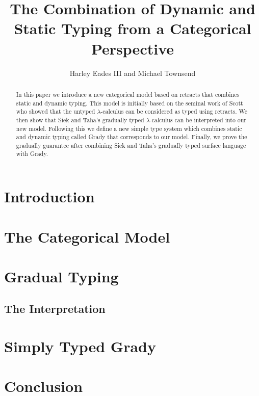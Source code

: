\documentclass{article}
\title{The Combination of Dynamic and Static Typing from a Categorical Perspective}
\author{Harley Eades III and Michael Townsend}
\begin{document}
\maketitle

\begin{abstract} 
  In this paper we introduce a new categorical model based on retracts
  that combines static and dynamic typing.  This model is initially
  based on the seminal work of Scott who showed that the untyped
  $\lambda$-calculus can be considered as typed using retracts.  We
  then show that Siek and Taha's gradually typed $\lambda$-calculus
  can be interpreted into our new model.  Following this we define a
  new simple type system which combines static and dynamic typing
  called Grady that corresponds to our model.  Finally, we prove the
  gradually guarantee after combining Siek and Taha's gradually typed
  surface language with Grady.
\end{abstract}

\section{Introduction}
\label{sec:introduction}


\section{The Categorical Model}
\label{subsec:the_categorical_model}


\section{Gradual Typing}
\label{sec:gradual_typing}



\subsection{The Interpretation}
\label{subsec:the_interpretation}


\section{Simply Typed Grady}
\label{sec:sl-grady}


\section{Conclusion}
\label{sec:conclusion}






\appendix



\end{document}
